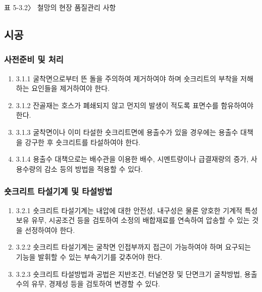 \documentclass[12pt,a4paper]{article}
\begin{document}
표 5-3.2〉 철망의 현장 품질관리 사항

\newpage
\subsection{시공}

\subsubsection{사전준비 및 처리}
\begin{enumerate}
\item  3.1.1 굴착면으로부터 뜬 돌을 주의하여 제거하여야 하며 숏크리트의 부착을 저해하는 요인들을 제거하여야 한다.  
\item  3.1.2 잔골재는 호스가 폐쇄되지 않고 먼지의 발생이 적도록 표면수를 함유하여야 한다.  
\item  3.1.3 굴착면이나 이미 타설한 숏크리트면에 용출수가 있을 경우에는 용출수 대책을 강구한 후 숏크리트를 타설하여야 한다.  
\item  3.1.4 용출수 대책으로는 배수관을 이용한 배수, 시멘트량이나 급결재량의 증가, 사용수량의 감소 등의 방법을 적용할 수 있다.  
\end{enumerate}

\subsubsection{숏크리트 타설기계 및 타설방법}
\begin{enumerate}
\item  3.2.1 숏크리트 타설기계는 내압에 대한 안전성, 내구성은 물론 양호한 기계적 특성 보유 유무, 시공조건 등을 검토하여 소정의 배합재료를 연속하여 압송할 수 있는 것을 선정하여야 한다.  
\item  3.2.2 숏크리트 타설기계는 굴착면 인접부까지 접근이 가능하여야 하며 요구되는 기능을 발휘할 수 있는 부속기기를 갖추어야 한다.  
\item  3.2.3 숏크리트 타설방법과 공법은 지반조건, 터널연장 및 단면크기 굴착방법, 용출수의 유무, 경제성 등을 검토하여 변경할 수 있다.   
\end{enumerate}
\end{document}
